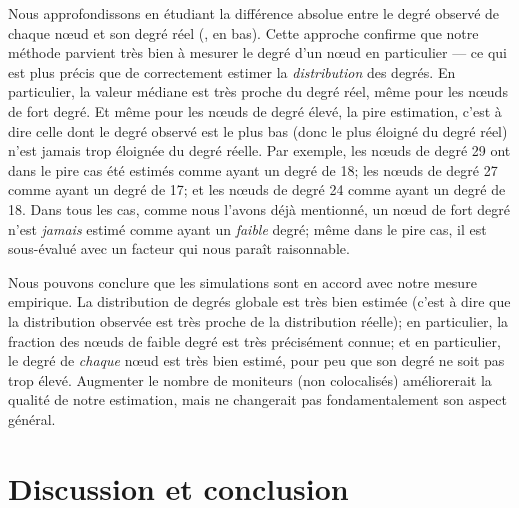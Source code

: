 Nous approfondissons en étudiant la différence absolue entre le degré observé
de chaque n\oe{}ud et son degré réel (, en
bas).
Cette approche confirme que notre méthode parvient très bien à mesurer le degré d'un n\oe{}ud en particulier --- ce qui est plus précis que de
correctement estimer la {\em distribution} des degrés. En particulier, la valeur médiane est
très proche du degré réel, même pour les n\oe{}uds de fort degré. Et même pour les
n\oe{}uds de degré élevé, la pire estimation, c'est à dire celle dont le degré
observé est le plus bas (donc le plus éloigné du degré réel) n'est jamais trop
éloignée du degré réelle. Par exemple, les n\oe{}uds de degré 29 ont dans le pire
cas été estimés comme ayant un degré de 18; les n\oe{}uds de degré 27 comme ayant
un degré de 17; et les n\oe{}uds de degré 24 comme ayant un degré de 18. Dans tous
les cas, comme nous l'avons déjà mentionné, un n\oe{}ud de fort degré n'est {\em
jamais} estimé comme ayant un {\em faible} degré; même dans le pire cas, il est
sous-évalué avec un facteur qui nous paraît raisonnable.

Nous pouvons conclure que les simulations sont en accord avec notre mesure
empirique. La distribution de degrés globale est très bien estimée (c'est à
dire que la distribution observée est très proche de la distribution réelle); en
particulier, la fraction des n\oe{}uds de faible degré est très précisément connue;
et en particulier, le degré de {\em chaque} n\oe{}ud est très bien estimé, pour peu
que son degré ne soit pas trop élevé. Augmenter le nombre de moniteurs (non
colocalisés) améliorerait la qualité de notre estimation, mais ne changerait pas
fondamentalement son aspect général.

\section{Discussion et conclusion}
\label{sec:udpping-conclusion}

